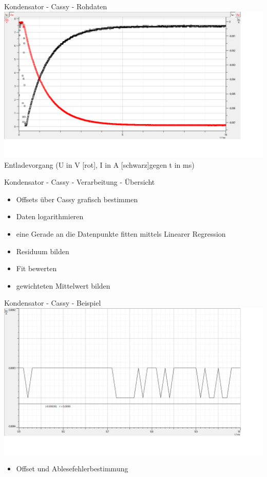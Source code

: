 \documentclass[11pt]{beamer}
\begin{document}
\begin{frame}{Kondensator - Cassy - Rohdaten}
\includegraphics[scale=0.2]{ent1.png}\\
Entladevorgang (U in V [rot], I in A [schwarz]gegen t in ms)\\
\end{frame}

\begin{frame}{Kondensator - Cassy - Verarbeitung - Übersicht}
\begin{itemize}
\item Offsets über Cassy grafisch bestimmen
\item Daten logarithmieren
\item eine Gerade an die Datenpunkte fitten mittels Linearer Regression
\item Residuum bilden
\item Fit bewerten
\item gewichteten Mittelwert bilden
\end{itemize}
\end{frame}

\begin{frame}{Kondensator - Cassy - Beispiel}
\includegraphics[scale=0.2]{offset_und_fehler.png}\\
\begin{itemize}
\item Offset und Ablesefehlerbestimmung
\end{itemize}
\end{frame}
\end{document}
